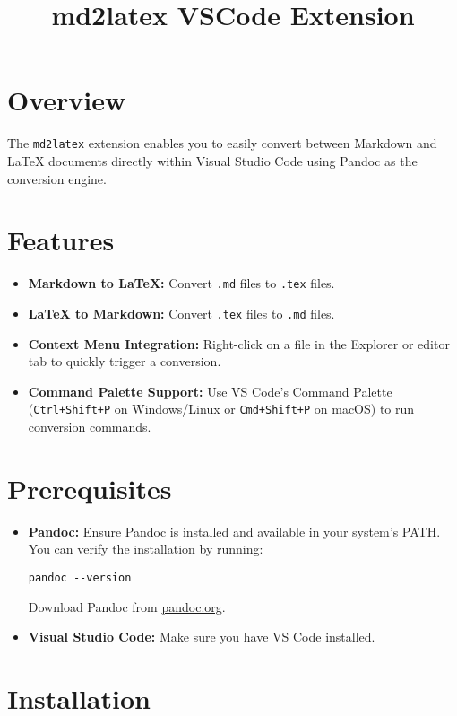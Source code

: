 \documentclass{article}
\title{md2latex VSCode Extension}
\date{}
\begin{document}
\maketitle

\section{Overview}
The \texttt{md2latex} extension enables you to easily convert between Markdown and LaTeX documents directly within Visual Studio Code using Pandoc as the conversion engine.

\section{Features}
\begin{itemize}
  \item \textbf{Markdown to LaTeX:} Convert \texttt{.md} files to \texttt{.tex} files.
  \item \textbf{LaTeX to Markdown:} Convert \texttt{.tex} files to \texttt{.md} files.
  \item \textbf{Context Menu Integration:} Right-click on a file in the Explorer or editor tab to quickly trigger a conversion.
  \item \textbf{Command Palette Support:} Use VS Code's Command Palette (\texttt{Ctrl+Shift+P} on Windows/Linux or \texttt{Cmd+Shift+P} on macOS) to run conversion commands.
\end{itemize}

\section{Prerequisites}
\begin{itemize}
  \item \textbf{Pandoc:} Ensure Pandoc is installed and available in your system's PATH. You can verify the installation by running:
  \begin{lstlisting}[basicstyle=\ttfamily,breaklines=true]
pandoc --version
  \end{lstlisting}
  Download Pandoc from \href{https://pandoc.org/installing.html}{pandoc.org}.
  
  \item \textbf{Visual Studio Code:} Make sure you have VS Code installed.
\end{itemize}

\section{Installation}
\end{document}
